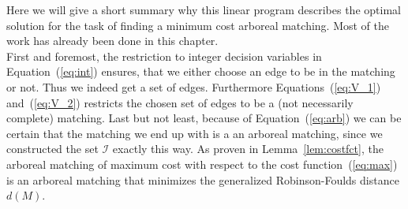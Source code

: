 \begin{rem} Here we will give a short summary why this linear program describes the optimal solution for the task of finding a minimum cost arboreal matching. Most of the work has already been done in this chapter.\\
First and foremost, the restriction to integer decision variables in Equation~(\ref{eq:int}) ensures, that we either choose an edge to be in the matching or not. Thus we indeed get a set of edges. Furthermore Equations~(\ref{eq:V_1}) and~(\ref{eq:V_2}) restricts the chosen set of edges to be a (not necessarily complete) matching. Last but not least, because of Equation~(\ref{eq:arb}) we can be certain that the matching we end up with is a an arboreal matching, since we constructed the set $\mathcal{I}$ exactly this way. As proven in Lemma~\ref{lem:costfct}, the arboreal matching of maximum cost with respect to the cost function~(\ref{eq:max}) is an arboreal matching that minimizes the generalized Robinson-Foulds distance $d(M)$.
\end{rem}